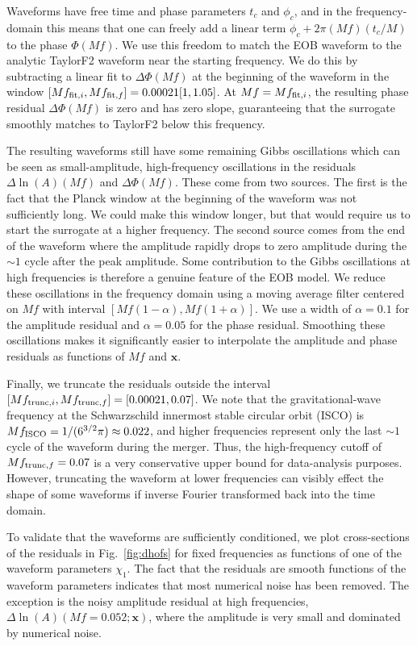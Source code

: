 \documentclass[prd,aps,letter,twocolumn,floatfix,notitlepage,nofootinbib]{revtex4-1}
\def\bx{\mathbf{x}}
\begin{document}
Waveforms have free time and phase parameters $t_c$ and $\phi_c$, and in the frequency-domain this means that one can freely add a linear term $\phi_c + 2\pi (Mf) (t_c/M)$ to the phase $\Phi(Mf)$. We use this freedom to match the EOB waveform to the analytic TaylorF2 waveform near the starting frequency. We do this by subtracting a linear fit to $\Delta\Phi(Mf)$ at the beginning of the waveform in the window $[Mf_{{\rm fit}, i}, Mf_{{\rm fit}, f}] = 0.00021[1, 1.05]$. At $Mf=Mf_{{\rm fit}, i}$, the resulting phase residual $\Delta\Phi(Mf)$ is zero and has zero slope, guaranteeing that the surrogate smoothly matches to TaylorF2 below this frequency.

The resulting waveforms still have some remaining Gibbs oscillations which can be seen as small-amplitude, high-frequency oscillations in the residuals $\Delta\ln(A)(Mf)$ and $\Delta\Phi(Mf)$. These come from two sources. The first is the fact that the Planck window at the beginning of the waveform was not sufficiently long. We could make this window longer, but that would require us to start the surrogate at a higher frequency. The second source comes from the end of the waveform where the amplitude rapidly drops to zero amplitude during the $\sim 1$ cycle after the peak amplitude. Some contribution to the Gibbs oscillations at high frequencies is therefore a genuine feature of the EOB model. We reduce these oscillations in the frequency domain using a moving average filter centered on $Mf$ with interval $[Mf(1-\alpha), Mf(1+\alpha)]$. We use a width of $\alpha=0.1$ for the amplitude residual and $\alpha=0.05$ for the phase residual. Smoothing these oscillations makes it significantly easier to interpolate the amplitude and phase residuals as functions of $Mf$ and $\bx$. 

Finally, we truncate the residuals outside the interval $[Mf_{{\rm trunc}, i}, Mf_{{\rm trunc}, f}] = [0.00021, 0.07]$. 
We note that the gravitational-wave frequency at the Schwarzschild innermost stable circular orbit (ISCO) is $Mf_{\rm ISCO} = 1/(6^{3/2}\pi) \approx 0.022$, and higher frequencies represent only the last $\sim 1$ cycle of the waveform during the merger. Thus, the high-frequency cutoff of $Mf_{{\rm trunc}, f}=0.07$ is a very conservative upper bound for data-analysis purposes. However, truncating the waveform at lower frequencies can visibly effect the shape of some waveforms if inverse Fourier transformed back into the time domain.

To validate that the waveforms are sufficiently conditioned, we plot cross-sections of the residuals in Fig.~\ref{fig:dhofs} for fixed frequencies as functions of one of the waveform parameters $\chi_1$. The fact that the residuals are smooth functions of the waveform parameters indicates that most numerical noise has been removed. The exception is the noisy amplitude residual at high frequencies, $\Delta\ln(A)(Mf=0.052; \bx)$, where the amplitude is very small and dominated by numerical noise. 
\end{document}
